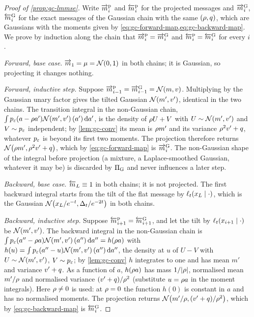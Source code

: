 \begin{proof}[Proof of \cref{prop:gc-lmmse}]
Write $\overrightarrow{m}^{\mathrm p}_i$ and $\overleftarrow{m}^{\mathrm p}_i$ for the projected messages and
$\overrightarrow{m}^{\mathrm G}_i$, $\overleftarrow{m}^{\mathrm G}_i$ for the exact messages of the Gaussian chain
with the same $(\rho,q)$, which are Gaussians with the moments given by
\cref{eq:gc-forward-map,eq:gc-backward-map}. We prove by induction along the chain
that $\overrightarrow{m}^{\mathrm p}_i=\overrightarrow{m}^{\mathrm G}_i$ and $\overleftarrow{m}^{\mathrm p}_i=\overleftarrow{m}^{\mathrm G}_i$ for
every $i$.

\emph{Forward, base case.} $\overrightarrow{m}_1=\mu=\mathcal{N}\!\left(0,1\right)$ in both chains; it is Gaussian,
so projecting it changes nothing.

\emph{Forward, inductive step.} Suppose $\overrightarrow{m}^{\mathrm p}_{i-1}=\overrightarrow{m}^{\mathrm G}_{i-1}=\mathcal{N}\!\left(m,v\right)$.
Multiplying by the Gaussian unary factor gives the tilted Gaussian $\mathcal{N}\!\left(m',v'\right)$,
identical in the two chains. The transition integral in the non-Gaussian chain,
$\int p_{\varepsilon}(a-\rho a')\mathcal{N}\!\left(m',v'\right)(a')\,\mathrm{d} a'$, is the density of $\rho U+V$ with
$U\sim\mathcal{N}\!\left(m',v'\right)$ and $V\sim p_{\varepsilon}$ independent; by \cref{lem:gc-conv} its mean is
$\rho m'$ and its variance $\rho^2v'+q$, whatever $p_{\varepsilon}$ is beyond its first two
moments. The projection therefore returns $\mathcal{N}\!\left(\rho m',\rho^2v'+q\right)$, which by
\cref{eq:gc-forward-map} is $\overrightarrow{m}^{\mathrm G}_i$. The non-Gaussian shape of the integral
before projection (a mixture, a Laplace-smoothed Gaussian, whatever it may be) is
discarded by $\Pi_{\mathrm{G}}$ and never influences a later step.

\emph{Backward, base case.} $\overleftarrow{m}_L\equiv1$ in both chains; it is not projected.
The first backward integral starts from the tilt of the flat message by
$\ell_t(x_L\mid\cdot)$, which is the Gaussian $\mathcal{N}\!\left(x_L/e^{-t},\Delta_t/e^{-2t}\right)$
in both chains.

\emph{Backward, inductive step.} Suppose $\overleftarrow{m}^{\mathrm p}_{i+1}=\overleftarrow{m}^{\mathrm G}_{i+1}$,
and let the tilt by $\ell_t(x_{i+1}\mid\cdot)$ be $\mathcal{N}\!\left(m',v'\right)$. The backward integral
in the non-Gaussian chain is $\int p_{\varepsilon}(a''-\rho a)\mathcal{N}\!\left(m',v'\right)(a'')\,\mathrm{d} a''=h(\rho a)$
with $h(u)=\int p_{\varepsilon}(a''-u)\mathcal{N}\!\left(m',v'\right)(a'')\,\mathrm{d} a''$, the density at $u$ of $U-V$ with
$U\sim\mathcal{N}\!\left(m',v'\right)$, $V\sim p_{\varepsilon}$; by \cref{lem:gc-conv} $h$ integrates to one and
has mean $m'$ and variance $v'+q$. As a function of $a$, $h(\rho a)$ has mass
$1/|\rho|$, normalised mean $m'/\rho$ and normalised variance $(v'+q)/\rho^2$
(substitute $u=\rho a$ in the moment integrals). Here $\rho\ne0$ is used: at
$\rho=0$ the function $h(0)$ is constant in $a$ and has no normalised moments. The
projection returns $\mathcal{N}\!\left(m'/\rho,(v'+q)/\rho^2\right)$, which by
\cref{eq:gc-backward-map} is $\overleftarrow{m}^{\mathrm G}_i$.


\end{proof}
